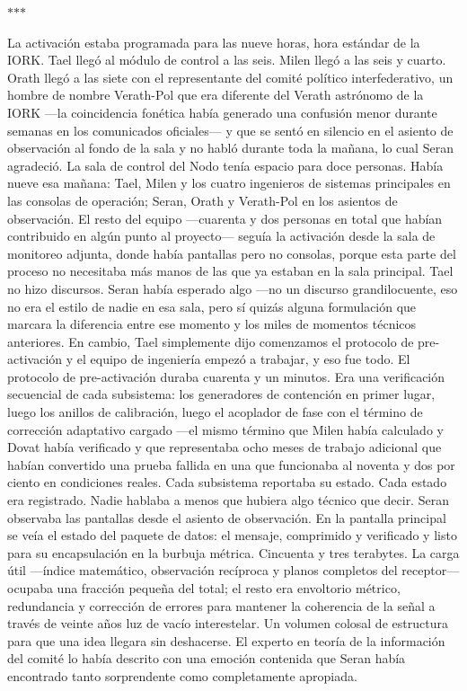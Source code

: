 \documentclass[11pt,a5paper,twoside]{book}
\begin{document}
\vspace{1.5em}
\begin{center}$\ast$\quad$\ast$\quad$\ast$\end{center}
\vspace{1.5em}

La activación estaba programada para las nueve horas, hora estándar de la IORK.
Tael llegó al módulo de control a las seis. Milen llegó a las seis y cuarto. Orath llegó a las siete con el representante del comité político interfederativo, un hombre de nombre Verath-Pol que era diferente del Verath astrónomo de la IORK —la coincidencia fonética había generado una confusión menor durante semanas en los comunicados oficiales— y que se sentó en silencio en el asiento de observación al fondo de la sala y no habló durante toda la mañana, lo cual Seran agradeció.
La sala de control del Nodo tenía espacio para doce personas. Había nueve esa mañana: Tael, Milen y los cuatro ingenieros de sistemas principales en las consolas de operación; Seran, Orath y Verath-Pol en los asientos de observación. El resto del equipo —cuarenta y dos personas en total que habían contribuido en algún punto al proyecto— seguía la activación desde la sala de monitoreo adjunta, donde había pantallas pero no consolas, porque esta parte del proceso no necesitaba más manos de las que ya estaban en la sala principal.
Tael no hizo discursos.
Seran había esperado algo —no un discurso grandilocuente, eso no era el estilo de nadie en esa sala, pero sí quizás alguna formulación que marcara la diferencia entre ese momento y los miles de momentos técnicos anteriores. En cambio, Tael simplemente dijo comenzamos el protocolo de pre-activación y el equipo de ingeniería empezó a trabajar, y eso fue todo.
El protocolo de pre-activación duraba cuarenta y un minutos. Era una verificación secuencial de cada subsistema: los generadores de contención en primer lugar, luego los anillos de calibración, luego el acoplador de fase con el término de corrección adaptativo cargado —el mismo término que Milen había calculado y Dovat había verificado y que representaba ocho meses de trabajo adicional que habían convertido una prueba fallida en una que funcionaba al noventa y dos por ciento en condiciones reales. Cada subsistema reportaba su estado. Cada estado era registrado. Nadie hablaba a menos que hubiera algo técnico que decir.
Seran observaba las pantallas desde el asiento de observación. En la pantalla principal se veía el estado del paquete de datos: el mensaje, comprimido y verificado y listo para su encapsulación en la burbuja métrica. Cincuenta y tres terabytes. La carga útil —índice matemático, observación recíproca y planos completos del receptor— ocupaba una fracción pequeña del total; el resto era envoltorio métrico, redundancia y corrección de errores para mantener la coherencia de la señal a través de veinte años luz de vacío interestelar. Un volumen colosal de estructura para que una idea llegara sin deshacerse. El experto en teoría de la información del comité lo había descrito con una emoción contenida que Seran había encontrado tanto sorprendente como completamente apropiada.
\end{document}
